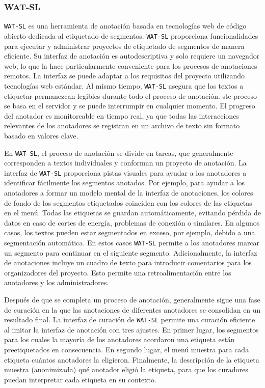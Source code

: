 \subsubsection*{WAT-SL}

\texttt{WAT-SL} es una herramienta de anotación basada en tecnologías web de código abierto dedicada al etiquetado de segmentos.
\texttt{WAT-SL} proporciona funcionalidades para ejecutar y administrar proyectos de etiquetado de segmentos de manera eficiente. Su interfaz de anotación es autodescriptiva y solo requiere un navegador web, lo que la hace particularmente conveniente para los procesos de anotaciones remotos.
La interfaz se puede adaptar a los requisitos del proyecto utilizando tecnologías web estándar.
Al mismo tiempo, \texttt{WAT-SL} asegura que los textos a etiquetar permanezcan legibles durante todo el proceso de anotación.
ste proceso se basa en el servidor y se puede interrumpir en cualquier momento.
El progreso del anotador es monitoreable en tiempo real, ya que todas las interacciones relevantes de los anotadores se registran en un archivo de texto sin formato basado en valores clave.

En \texttt{WAT-SL}, el proceso de anotación se divide en tareas, que generalmente corresponden a textos individuales y conforman un proyecto de anotación.
La interfaz de \texttt{WAT-SL} proporciona pistas visuales para ayudar a los anotadores a identificar fácilmente los segmentos anotados.
Por ejemplo, para ayudar a los anotadores a formar un modelo mental de la interfaz de anotaciones, los colores de fondo de los segmentos etiquetados coinciden con los colores de las etiquetas en el menú.
Todas las etiquetas se guardan automáticamente, evitando pérdida de datos en caso de cortes de energía, problemas de conexión o similares.
En algunos casos, los textos pueden estar segmentados en exceso, por ejemplo, debido a una segmentación automática.
En estos casos \texttt{WAT-SL} permite a los anotadores marcar un segmento para continuar en el siguiente segmento.
Adicionalmente, la interfaz de anotaciones incluye un cuadro de texto para introducir comentarios para los organizadores del proyecto.
Esto permite una retroalimentación entre los anotadores y los administradores.

Después de que se completa un proceso de anotación, generalmente sigue una fase de curación en la que las anotaciones de diferentes anotadores se consolidan en un resultado final.
La interfaz de curación de \texttt{WAT-SL} permite una curación eficiente al imitar la interfaz de anotación con tres ajustes.
En primer lugar, los segmentos para los cuales la mayoría de los anotadores acordaron una etiqueta están preetiquetados en consecuencia.
En segundo lugar, el menú muestra para cada etiqueta cuántos anotadores la eligieron.
Finalmente, la descripción de la etiqueta muestra (anonimizada) qué anotador eligió la etiqueta, para que los curadores puedan interpretar cada etiqueta en su contexto.

